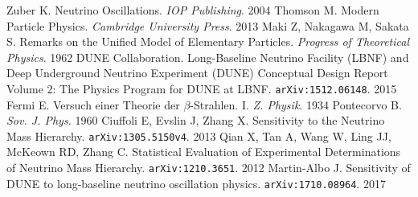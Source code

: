 \documentclass[10pt, a4paper]{article}
\begin{document}


\begin{thebibliography}{20} 
	 Zuber K. Neutrino
		Oscillations. \textit{IOP Publishing}. 2004
	 Thomson M. Modern Particle Physics. \textit{Cambridge
		University Press}. 2013
	 Maki Z, Nakagawa M, Sakata S. Remarks on the Unified Model of
		Elementary Particles. \textit{Progress of Theoretical Physics}. 1962
	 DUNE Collaboration. Long-Baseline Neutrino Facility (LBNF) and
		Deep Underground Neutrino Experiment (DUNE) Conceptual Design Report Volume
		2: The Physics Program for DUNE at LBNF. \texttt{arXiv:1512.06148}. 2015
	 Fermi E. Versuch einer Theorie der $\beta$-Strahlen. I.
		\textit{Z. Physik}. 1934
	 Pontecorvo B. \textit{Sov. J. Phys.} 1960
	 Ciuffoli E, Evslin J, Zhang X. Sensitivity to the
		Neutrino Mass Hierarchy. \texttt{arXiv:1305.5150v4}. 2013
	 Qian X, Tan A, Wang W, Ling JJ, McKeown RD, Zhang C.
		Statistical Evaluation of Experimental Determinations of Neutrino Mass
		Hierarchy. \texttt{arXiv:1210.3651}. 2012
	 Martin-Albo J. Sensitivity of DUNE to long-baseline
		neutrino oscillation physics. \texttt{arXiv:1710.08964}. 2017
	
\end{thebibliography} 
\end{document}
